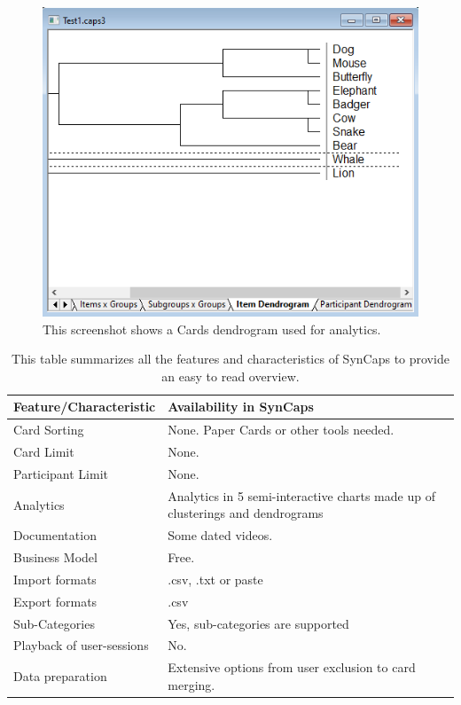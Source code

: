 \begin{figure}[tp] 
\centering
\includegraphics[keepaspectratio,width=\linewidth,height=\halfh]{images/syncaps-diagram-2.png}
\caption[SynCaps Dendrogram] { This screenshot shows a Cards 
dendrogram used for analytics.
 }
\label{fig:SynCaps3}
\end{figure}

\begin{table}[tp]
\centering
\begin{tabularx}
{\linewidth}{|l|X|}
\hline \textbf{Feature/Characteristic} & \textbf{Availability in SynCaps} \\ 
\hline Card Sorting & None. Paper Cards or other tools needed. \\ 
\hline Card Limit & None. \\
\hline Participant Limit & None. \\
\hline Analytics & Analytics in 5 semi-interactive
charts made up of clusterings and dendrograms \\ 
\hline Documentation & Some dated videos. \\
\hline Business Model & Free. \\
\hline Import formats & .csv, .txt or paste\\ 
\hline Export formats & .csv \\ 
\hline Sub-Categories & Yes, sub-categories are supported \\ 
\hline Playback of user-sessions & No. \\ 
\hline Data preparation & Extensive options from user exclusion to
card merging. \\ 
\hline
\end{tabularx} 
\caption[Feature summary of SynCaps] 
{ 
This table summarizes all the features and characteristics of SynCaps
to provide an easy to read overview.
}
\label{tab:features-SynCaps}
\end{table}


